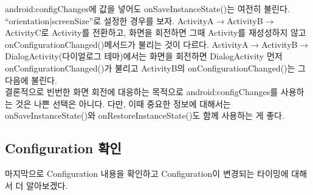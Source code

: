 android:configChanges에 값을 넣어도 onSaveInstanceState()는 여전히 불린다. ``orientation|screenSize''로 설정한 경우를 보자.
ActivityA$\rightarrow$ActivityB$\rightarrow$ActivityC로 Activity를 전환하고, 화면을 회전하면 그때 Activity를 재성성하지 않고 onConfigurationChanged()메서드가 불리는 것이 다르다.
ActivityA$\rightarrow$ActivityB$\rightarrow$Dia\-logActivity(다이얼로그 테마)에서는 화면을 회전하면 DialogActivity 먼저 onConfigurationChanged()가 불리고 ActivityB의 onConfigurationChanged()는 그 다음에 불린다.\\

결론적으로 빈번한 화면 회전에 대응하는 목적으로 android:configChanges를 사용하는 것은 나쁜 선택은 아니다.
다만, 이때 중요한 정보에 대해서는 onSaveInstanceState()와  onRestoreInstanceState()도 함께 사용하는 게 좋다.\\

\subsection{Configuration 확인}
마지막으로 Configuration 내용을 확인하고 Configuration이 변경되는 타이밍에 대해서 더 알아보겠다.\\
 
